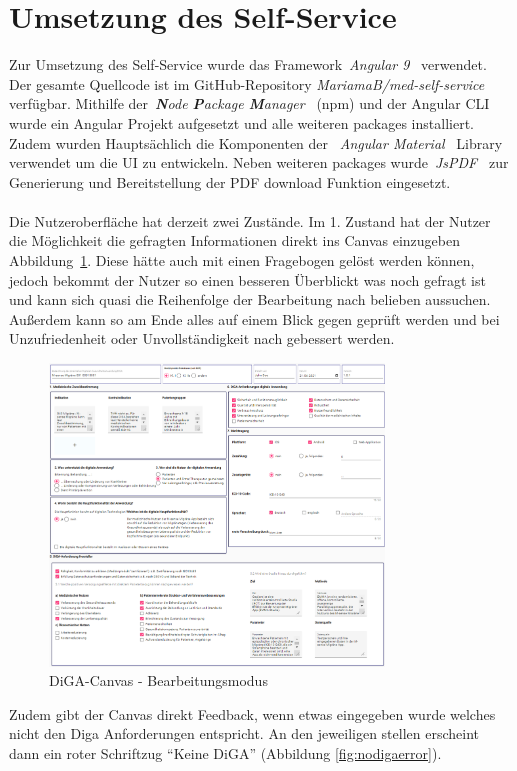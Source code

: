 \section{Umsetzung des Self-Service}
Zur Umsetzung des Self-Service wurde das Framework~\textit{Angular 9}~\cite{angular} verwendet. Der gesamte Quellcode ist im GitHub-Repository \textit{MariamaB/med-self-service}~\cite{medselfservice} verfügbar. Mithilfe der~\textit{\textbf{N}ode \textbf{P}ackage \textbf{M}anager}~\cite{npm} (npm) und der Angular CLI wurde ein Angular Projekt aufgesetzt und alle weiteren packages installiert. Zudem wurden Hauptsächlich die Komponenten der ~\textit{Angular Material}~\cite{angularmaterial} Library verwendet um die UI zu entwickeln. Neben weiteren packages wurde~\textit{JsPDF}~\cite{jspdf} zur Generierung und Bereitstellung der PDF download Funktion eingesetzt.
\\\\
Die Nutzeroberfläche hat derzeit zwei Zustände. Im 1. Zustand hat der Nutzer die Möglichkeit die gefragten Informationen direkt ins Canvas einzugeben Abbildung~\ref{fig:canvasonedit}. Diese hätte auch mit einen Fragebogen gelöst werden können, jedoch bekommt der Nutzer so einen besseren Überblickt was noch gefragt ist und kann sich quasi die Reihenfolge der Bearbeitung nach belieben aussuchen. Außerdem kann so am Ende alles auf einem Blick gegen geprüft werden und bei Unzufriedenheit oder Unvollständigkeit nach gebessert werden.
\begin{figure}[H]
	\centering
	\includegraphics[width=336.7px, keepaspectratio]{assets/onEdit.png}
	\caption[DiGA-Canvas - Bearbeitungsmodus]{DiGA-Canvas - Bearbeitungsmodus}
	\label{fig:canvasonedit}
\end{figure}
\newpage
Zudem gibt der Canvas direkt Feedback, wenn etwas eingegeben wurde welches nicht den Diga Anforderungen entspricht. An den jeweiligen stellen erscheint dann ein roter Schriftzug ``Keine DiGA'' (Abbildung \ref{fig:nodigaerror}).
